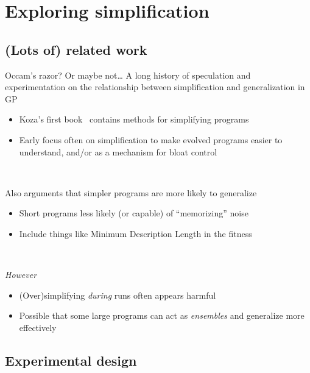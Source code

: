 \documentclass{beamer}
\begin{document}
\section{Exploring simplification}

\subsection{(Lots of) related work}

\begin{frame}{Occam's razor? Or maybe not\ldots}
A long history of speculation and experimentation on the relationship between simplification and generalization in GP
\begin{itemize}
	\item Koza's first book~\cite{koza1992genetic} contains methods for simplifying programs
	\item Early focus often on simplification to make evolved programs easier to understand, and/or as a mechanism for bloat control
\end{itemize}

~

Also arguments that simpler programs are more likely to generalize~\cite{hooper:1996:iarGPes}
\begin{itemize}
	\item Short programs less likely (or capable) of ``memorizing'' noise
	\item Include things like Minimum Description Length in the fitness~\cite{iba1994genetic}
\end{itemize}

~

\emph{However}
\begin{itemize}
	\item (Over)simplifying \emph{during} runs often appears harmful
	\item Possible that some large programs can act as \emph{ensembles} and generalize more effectively~\cite{gonccalves2015generalization}
\end{itemize}

\end{frame}

\subsection{Experimental design}
\end{document}
